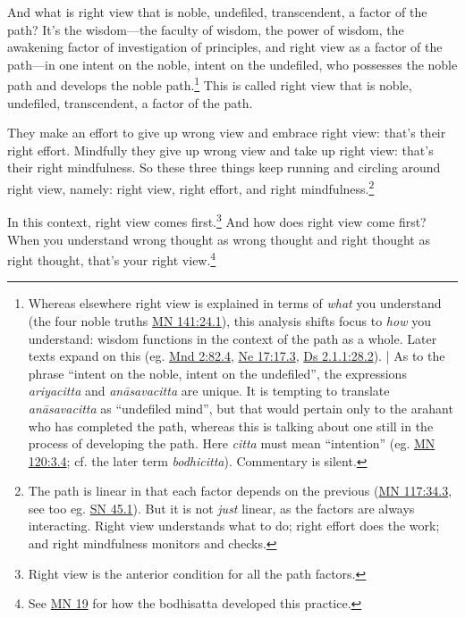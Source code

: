 \documentclass[12pt,openany]{book}%
\begin{document}
And what is right view that is noble, undefiled, transcendent, a factor of the path? It’s the wisdom—the faculty of wisdom, the power of wisdom, the awakening factor of investigation of principles, and right view as a factor of the path—in one intent on the noble, intent on the undefiled, who possesses the noble path and develops the noble path.\footnote{Whereas elsewhere right view is explained in terms of \emph{what} you understand (the four noble truths \href{https://suttacentral.net/mn141/en/sujato\#24.1}{MN 141:24.1}), this analysis shifts focus to \emph{how} you understand: wisdom functions in the context of the path as a whole. Later texts expand on this (eg. \href{https://suttacentral.net/mnd2/en/sujato\#82.4}{Mnd 2:82.4}, \href{https://suttacentral.net/ne17/en/sujato\#17.3}{Ne 17:17.3}, \href{https://suttacentral.net/ds2.1.1/en/sujato\#28.2}{Ds 2.1.1:28.2}). | As to the phrase “intent on the noble, intent on the undefiled”, the expressions \textit{ariyacitta} and  \textit{\textsanskrit{anāsavacitta}} are unique. It is tempting to translate \textit{\textsanskrit{anāsavacitta}} as “undefiled mind”, but that would pertain only to the arahant who has completed the path, whereas this is talking about one still in the process of developing the path. Here \textit{citta} must mean “intention” (eg. \href{https://suttacentral.net/mn120/en/sujato\#3.4}{MN 120:3.4}; cf. the later term \textit{bodhicitta}). Commentary is silent. } This is called right view that is noble, undefiled, transcendent, a factor of the path. 

They make an effort to give up wrong view and embrace right view: that’s their right effort. Mindfully they give up wrong view and take up right view: that’s their right mindfulness. So these three things keep running and circling around right view, namely: right view, right effort, and right mindfulness.\footnote{The path is linear in that each factor depends on the previous (\href{https://suttacentral.net/mn117/en/sujato\#34.3}{MN 117:34.3}, see too eg. \href{https://suttacentral.net/sn45.1/en/sujato}{SN 45.1}). But it is not \emph{just} linear, as the factors are always interacting. Right view understands what to do; right effort does the work; and right mindfulness monitors and checks. } 

In this context, right view comes first.\footnote{Right view is the anterior condition for all the path factors. } And how does right view come first? When you understand wrong thought as wrong thought and right thought as right thought, that’s your right view.\footnote{See \href{https://suttacentral.net/mn19/en/sujato}{MN 19} for how the bodhisatta developed this practice. } 
\end{document}
